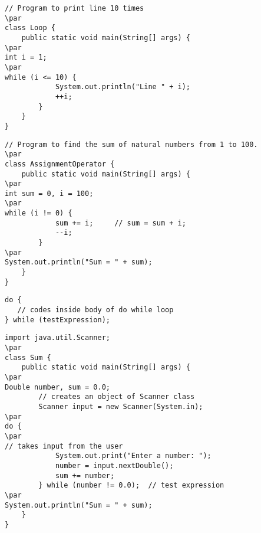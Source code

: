 \documentclass{book}
\def\lthtmlcheckvsize{\ifdim\ht\sizebox<\vsize 
  \ifdim\wd\sizebox<\hsize\expandafter\hfill\fi \expandafter\vfill
  \else\expandafter\vss\fi}%
\begin{document}
{\newpage\clearpage
{}%
\begin{lstlisting}
// Program to print line 10 times
\par
class Loop {
    public static void main(String[] args) {
\par
int i = 1;
\par
while (i <= 10) {
            System.out.println("Line " + i);
            ++i;
        }
    }
}
\end{lstlisting}%
\lthtmlfigureZ
\lthtmlcheckvsize\clearpage}

{\newpage\clearpage
{}%
\begin{lstlisting}
// Program to find the sum of natural numbers from 1 to 100.
\par
class AssignmentOperator {
    public static void main(String[] args) {
\par
int sum = 0, i = 100;
\par
while (i != 0) {
            sum += i;     // sum = sum + i;
            --i;
        }
\par
System.out.println("Sum = " + sum);
    }
}
\end{lstlisting}%
\lthtmlfigureZ
\lthtmlcheckvsize\clearpage}

{\newpage\clearpage
{}%
\begin{lstlisting}
do {
   // codes inside body of do while loop
} while (testExpression);
\end{lstlisting}%
\lthtmlfigureZ
\lthtmlcheckvsize\clearpage}

{\newpage\clearpage
{}%
\begin{lstlisting}
import java.util.Scanner;
\par
class Sum {
    public static void main(String[] args) {
\par
Double number, sum = 0.0;
        // creates an object of Scanner class
        Scanner input = new Scanner(System.in);
\par
do {
\par
// takes input from the user
            System.out.print("Enter a number: ");
            number = input.nextDouble();
            sum += number;
        } while (number != 0.0);  // test expression
\par
System.out.println("Sum = " + sum);
    }
}
\end{lstlisting}%
\lthtmlfigureZ
\lthtmlcheckvsize\clearpage}
\end{document}

